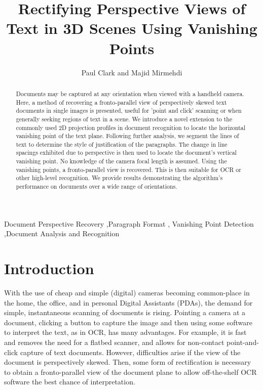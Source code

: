 \documentclass{elsart}   %
\begin{document}
\begin{frontmatter}

\title{Rectifying Perspective Views of Text in 3D Scenes Using Vanishing Points}

\author{Paul Clark and Majid Mirmehdi}  %

\address{
Department of Computer Science, University of Bristol, Bristol BS8 1UB, UK %
}

\begin{abstract}
Documents may be captured at any orientation when viewed with a handheld camera.
Here, a method of recovering a fronto-parallel view of perspectively skewed text
documents in single images is presented, useful for 'point and click' scanning
or when generally seeking regions of text in a scene.  We introduce a novel
extension to the commonly used 2D projection profiles in document recognition to
locate the horizontal vanishing point of the text plane.  Following further
analysis, we segment the lines of text to determine the style of justification
of the paragraphs.  The change in line spacings exhibited due to perspective is
then used to locate the document's vertical vanishing point. No knowledge of the
camera focal length is assumed. Using the vanishing points, a fronto-parallel
view is recovered. This is then suitable for OCR or other high-level
recognition.  We provide results demonstrating the algorithm's performance on
documents over a wide range of orientations.
\end{abstract}

\begin{keyword}
Document Perspective Recovery  \sep Paragraph Format \sep 
Vanishing Point Detection \sep Document Analysis and Recognition 
\end{keyword}
\end{frontmatter}


\section{Introduction}
With the use of cheap and simple (digital) cameras becoming common-place in the
home, the office, and in personal Digital Assistants (PDAs), the demand for
simple, instantaneous scanning of documents is rising. Pointing a camera at a
document, clicking a button to capture the image and then using some software to
interpret the text, as in OCR, has many advantages. For example, it is fast and
removes the need for a flatbed scanner, and allows for non-contact
point-and-click capture of text documents. However, difficulties arise if the
view of the document is perspectively skewed. Then, some form of rectification
is necessary to obtain a fronto-parallel view of the document plane to allow
off-the-shelf OCR software the best chance of interpretation.
\end{document}
